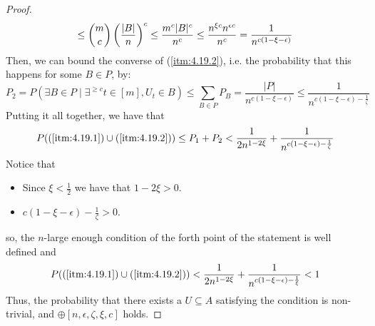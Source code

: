 \begin{lemma}[Lemma 4.19]
\begin{proof}
\[                    \leq {m \choose c} \left( \frac{|B|}{n} \right)^c
                    \leq \frac{m^c |B|^c}{n^c}
                    \leq \frac{n^{\xi c} n^{\epsilon c}}{n^c}
                    = \frac{1}{n^{c (1 - \xi - \epsilon)}}
            \]
            Then, we can bound the converse of (\ref{itm:4.19.2}), i.e. the probability that this happens for some $B \in P$,
            by:
            \[
                P_2 = P(\exists B \in P \mid \exists^{\geq c} t\in [m], U_t \in B)
                    \leq \sum_{B \in P} P_B
                    = \frac{|P|}{n^{c (1 - \xi - \epsilon)}}
                    \leq \frac{1}{n^{c (1 - \xi - \epsilon) - \frac{1}{\zeta}}}
            \]
            Putting it all together, we have that
            \[
                P((\ref{itm:4.19.1}) \cup (\ref{itm:4.19.2}))
                    \leq P_1 + P_2
                    < \frac{1}{2n^{1-2\xi}} + \frac{1}{n^{c (1 - \xi - \epsilon) - \frac{1}{\zeta}}}
            \]
            Notice that
            \begin{itemize}
                \item Since $\xi < \frac{1}{2}$ we have that $1 - 2\xi > 0$.
                \item $c (1 - \xi - \epsilon) - \frac{1}{\zeta}> 0$.
            \end{itemize}
            so, the $n$-large enough condition of the forth point of the statement is well defined and
            \[
                P((\ref{itm:4.19.1}) \cup (\ref{itm:4.19.2}))
                    < \frac{1}{2n^{1-2\xi}} + \frac{1}{n^{c (1 - \xi - \epsilon) - \frac{1}{\xi}}}
                    < 1
            \]
            Thus, the probability that there exists a $U \subseteq A$ satisfying the condition is non-trivial,
            and $\oplus[n, \epsilon, \zeta, \xi, c]$ holds.
        \end{proof}
    \end{lemma}

